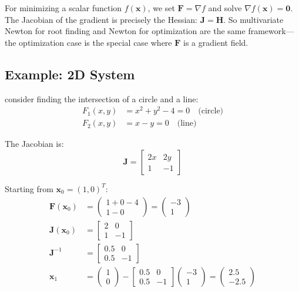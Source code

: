  For minimizing a scalar function $f(\mathbf{x})$, we set $\mathbf{F} = \nabla f$ and solve $\nabla f(\mathbf{x}) = \mathbf{0}$. The Jacobian of the gradient is precisely the Hessian: $\mathbf{J} = \mathbf{H}$. So multivariate Newton for root finding and Newton for optimization are the same framework---the optimization case is the special case where $\mathbf{F}$ is a gradient field.


\subsection{Example: 2D System}

 consider finding the intersection of a circle and a line:
\begin{align}
    F_1(x, y) &= x^2 + y^2 - 4 = 0 \quad \text{(circle)} \\
    F_2(x, y) &= x - y = 0 \quad \text{(line)}
\end{align}

The Jacobian is:
\begin{equation}
    \mathbf{J} = \begin{bmatrix}
        2x & 2y \\
        1 & -1
    \end{bmatrix}
\end{equation}

Starting from $\mathbf{x}_0 = (1, 0)^T$:
\begin{align*}
    \mathbf{F}(\mathbf{x}_0) &= \begin{pmatrix} 1 + 0 - 4 \\ 1 - 0 \end{pmatrix} = \begin{pmatrix} -3 \\ 1 \end{pmatrix} \\
    \mathbf{J}(\mathbf{x}_0) &= \begin{bmatrix} 2 & 0 \\ 1 & -1 \end{bmatrix} \\
    \mathbf{J}^{-1} &= \begin{bmatrix} 0.5 & 0 \\ 0.5 & -1 \end{bmatrix} \\
    \mathbf{x}_1 &= \begin{pmatrix} 1 \\ 0 \end{pmatrix} - \begin{bmatrix} 0.5 & 0 \\ 0.5 & -1 \end{bmatrix} \begin{pmatrix} -3 \\ 1 \end{pmatrix} = \begin{pmatrix} 2.5 \\ -2.5 \end{pmatrix}
\end{align*}

